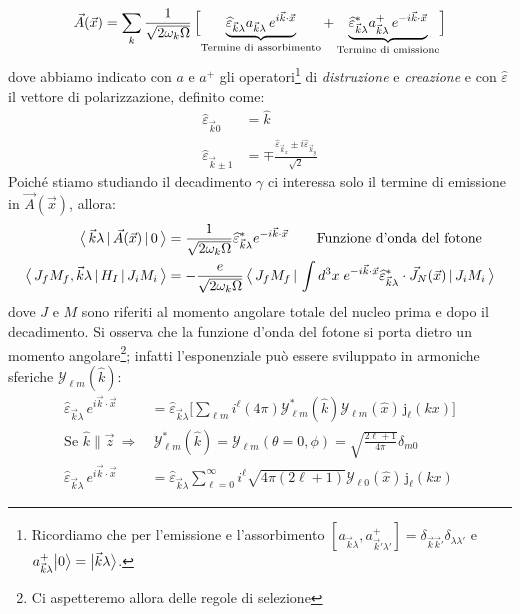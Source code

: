 $$\vec{A}(\vec{x}) = \sum_k \frac{1}{\sqrt{2\omega_k\Omega}}\, \Bigl [ \underbrace{\widehat{\varepsilon}_{\vec{k}\lambda} a_{\vec{k}\lambda}\, e^{i\vec{k}\cdot\vec{x}}}_\text{Termine di assorbimento} + \underbrace{\widehat{\varepsilon}_{\vec{k}\lambda}^* a_{\vec{k}\lambda}^+\, e^{-i\vec{k}\cdot\vec{x}}}_\text{Termine di emissione}  \Bigr ]$$
dove abbiamo indicato con $a$ e $a^+$ gli operatori\footnote{Ricordiamo che per l'emissione e l'assorbimento $[a_{\vec{k}\lambda},a_{\vec{k}'\lambda'}^+] = \delta_{\vec{k}\vec{k}'}\delta_{\lambda\lambda'}$ e $a^+_{\vec{k}\lambda} \bigl | 0 \bigr \rangle = \bigl | \vec{k}\lambda \bigr \rangle$.} di \textit{distruzione} e \textit{creazione} e con $\widehat{\varepsilon}$ il vettore di polarizzazione, definito come:
\begin{displaymath}
\begin{aligned}
\widehat{\varepsilon}_{\vec{k}0} &= \widehat{k} \\
\widehat{\varepsilon}_{\vec{k}\pm 1} &= \mp \frac{\widehat{\varepsilon}_{\vec{k}_x}\pm i\widehat{\varepsilon}_{\vec{k}_y}}{\sqrt{2}}
\end{aligned}
\end{displaymath}
Poiché stiamo studiando il decadimento $\gamma$ ci interessa solo il termine di emissione in $\vec{A}(\vec{x})$, allora:
\begin{displaymath}
\begin{aligned}
\oss{\vec{k}\lambda}{\vec{A}(\vec{x})}{0} &= \frac{1}{\sqrt{2\omega_k\Omega}} \widehat{\varepsilon}^*_{\vec{k}\lambda} e^{-i\vec{k}\cdot\vec{x}}\qquad \text{Funzione d'onda del fotone} \\
%
\oss{J_f M_f,\vec{k}\lambda}{H_I}{J_i M_i} &= - \frac{e}{\sqrt{2\omega_k\Omega}} \, \oss{J_f M_f}{\int d^3x \; e^{-i\vec{k}\cdot\vec{x}}\widehat{\varepsilon}^*_{\vec{k}\lambda}\cdot\vec{J}_N (\vec{x})}{J_i M_i}
\end{aligned}
\end{displaymath}
dove $J$ e $M$ sono riferiti al momento angolare totale del nucleo prima e dopo il decadimento.
Si osserva che la funzione d'onda del fotone si porta dietro un momento angolare\footnote{Ci aspetteremo allora delle regole di selezione}; infatti l'esponenziale può essere sviluppato in armoniche sferiche $\mathcal{Y}_{\ell m}(\hat{k})$:
\begin{displaymath}
\begin{aligned}
\widehat{\varepsilon}_{\vec{k}\lambda}\, e^{i\vec{k}\cdot\vec{x}} &= \widehat{\varepsilon}_{\vec{k}\lambda} \Biggl [ \sum_{\ell m} i^\ell (4\pi) \mathcal{Y}_{\ell m}^*(\hat{k})\mathcal{Y}_{\ell m}(\hat{x})\, \mathrm{j}_\ell (kx) \Biggr ] \\
%
\text{Se } \hat{k} \parallel \vec{z} \:\Rightarrow&\: \mathcal{Y}_{\ell m}^* (\hat{k}) = \mathcal{Y}_{\ell m} (\theta=0,\phi) = \sqrt{\frac{2\ell+1}{4\pi}} \delta_{m0} \\
%
\widehat{\varepsilon}_{\vec{k}\lambda}\, e^{i\vec{k}\cdot\vec{x}} &= \widehat{\varepsilon}_{\vec{k}\lambda} \sum_{\ell=0}^\infty i^\ell \sqrt{4\pi(2\ell+1)} \mathcal{Y}_{\ell 0}(\hat{x})\, \mathrm{j}_\ell (kx)
\end{aligned}
\end{displaymath}
